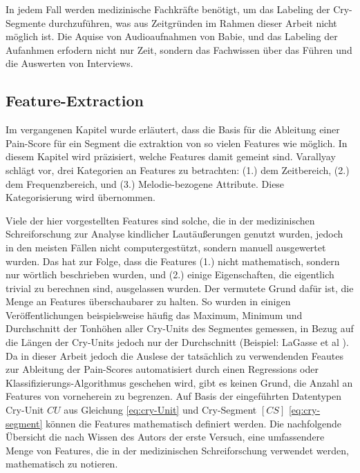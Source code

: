 In jedem Fall werden medizinische Fachkräfte benötigt, um das Labeling der Cry-Segmente durchzuführen, was aus Zeitgründen im Rahmen dieser Arbeit nicht möglich ist. Die Aquise von Audioaufnahmen von Babie, und das Labeling der Aufanhmen erfodern nicht nur Zeit, sondern das Fachwissen über das Führen und die Auswerten von Interviews.

\subsection{Feature-Extraction}
\label{sec:segmentFeatures}

Im vergangenen Kapitel wurde erläutert, dass die Basis für die Ableitung einer Pain-Score für ein Segment die extraktion von \glqq so vielen Features wie möglich\grqq{}. In diesem Kapitel wird präzisiert, welche Features damit gemeint sind.  Varallyay \cite[S. 16 - 17]{cry_thesis} schlägt vor, drei Kategorien an Features zu betrachten: (1.) dem Zeitbereich, (2.) dem Frequenzbereich, und (3.) Melodie-bezogene Attribute. Diese Kategorisierung wird übernommen.

Viele der hier vorgestellten Features sind solche, die in der medizinischen Schreiforschung zur Analyse kindlicher Lautäußerungen genutzt wurden, jedoch in den meisten Fällen nicht computergestützt, sondern manuell ausgewertet wurden. Das hat zur Folge, dass die Features (1.) nicht mathematisch, sondern nur wörtlich beschrieben wurden, und (2.) einige Eigenschaften, die eigentlich trivial zu berechnen sind, ausgelassen wurden. Der vermutete Grund dafür ist, die Menge an Features überschaubarer zu halten. So wurden in einigen Veröffentlichungen beispielsweise häufig das Maximum, Minimum und Durchschnitt der Tonhöhen aller Cry-Units des Segmentes gemessen, in Bezug auf die Längen der Cry-Units jedoch nur der Durchschnitt (Beispiel: LaGasse et al \cite[S. 85]{parentalPerception}). Da in dieser Arbeit jedoch die Auslese der tatsächlich zu verwendenden Feautes zur Ableitung der Pain-Scores automatisiert durch einen Regressions oder Klassifizierungs-Algorithmus geschehen wird, gibt es keinen Grund, die Anzahl an Features von vorneherein zu begrenzen.  Auf Basis der eingeführten Datentypen Cry-Unit $CU$ aus Gleichung \ref{eq:cry-Unit} und Cry-Segment $[CS]$ \ref{eq:cry-segment} können die Features mathematisch definiert werden. Die nachfolgende Übersicht die nach Wissen des Autors der erste Versuch, eine umfassendere Menge von Features, die in der medizinischen Schreiforschung verwendet werden, mathematisch zu notieren.

